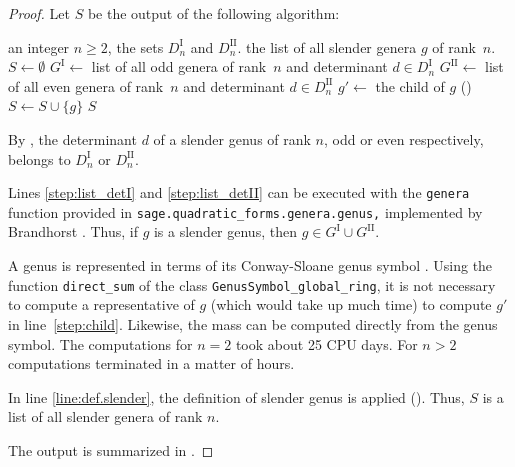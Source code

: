 \documentclass[a4paper]{amsart}
\newenvironment{myalgorithm}{\captionsetup{type=algType}}{}
\theoremstyle{definition}
\theoremstyle{plain}
\newcommand{\I}{\mathrm{I}}
\newcommand{\II}{\mathrm{II}}
\begin{document}
\begin{proof}
    Let \(S\) be the output of the following algorithm:
    \begin{myalgorithm}\caption{Slender genera}\label{alg:slender}
    \begin{algorithmic}[1]
         \REQUIRE an integer \(n \geq 2\), the sets \(D_n^{\I}\) and \(D_n^\II\).
         \ENSURE the list of all slender genera \(g\) of rank~\(n\).
         \STATE \(S \longleftarrow \emptyset\)
        \STATE \(G^{\I} \longleftarrow\) list of all odd genera of rank~\(n\) and determinant \(d \in D_n^{\I}\) \label{step:list_detI}
         \STATE \(G^{\II} \longleftarrow\) list of all even genera of rank~\(n\) and determinant \(d \in D_n^{\II}\) \label{step:list_detII}
        \FORALL{\(g \in G^{\I} \cup G^{\II}\)}
            \STATE \(g' \longleftarrow\) the child of \(g\) () \label{step:child}
             \label{line:def.slender}
                \STATE \(S \longleftarrow S \cup \{g\}\)
            \ENDIF
        \ENDFOR
         \RETURN \(S\)
    \end{algorithmic}
    \end{myalgorithm}

    By , the determinant \(d\) of a slender genus of rank \(n\), odd or even respectively, belongs to \(D_n^\I\) or \(D_n^\II\). 

    \sloppy
    Lines \ref{step:list_detI} and \ref{step:list_detII} can be executed with the \verb+genera+ function provided in \verb+sage.quadratic_forms.genera.genus,+ implemented by Brandhorst \cite{brandhorst_discriminant_forms}.
    Thus, if \(g\) is a slender genus, then \(g \in G^\I \cup G^\II\). 

    A genus is represented in terms of its Conway-Sloane genus symbol \cite[Chapter 15 \S 7.8]{splag}.
    Using the function \verb+direct_sum+ of the class \verb+GenusSymbol_global_ring+, it is not necessary to compute a representative of \(g\) (which would take up much time) to compute \(g'\) in line~\ref{step:child}. Likewise, the mass can be computed directly from the genus symbol. The computations for \(n = 2\) took about 25 CPU days. For \(n > 2\) computations terminated in a matter of hours.

    In line \ref{line:def.slender}, the definition of slender genus is applied (). Thus, \(S\) is a list of all slender genera of rank \(n\). 
    
    The output is summarized in .     
\end{proof}
\end{document}
